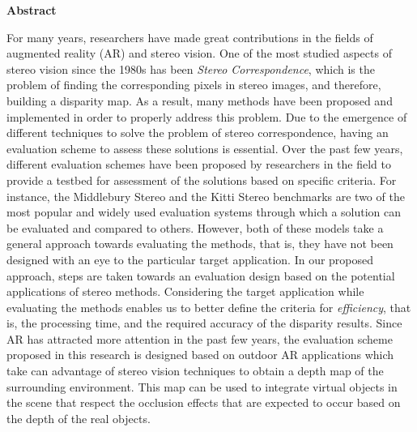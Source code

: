 \begin{center}
\textbf{\large Abstract}
\end{center}
For many years, researchers have made great contributions in the fields of augmented reality (AR) and stereo vision. 
One of the most studied aspects of stereo vision since the 1980s has been \textit{Stereo Correspondence}, which is the problem of 
finding the corresponding pixels in stereo images, and therefore, building a disparity map.
As a result, many methods have been proposed and implemented in order to properly address this problem. 
Due to the emergence of different techniques to solve the problem of stereo correspondence, having an evaluation scheme to assess 
these solutions is essential. Over the past few years, different evaluation schemes have been proposed 
by researchers in the field to provide a testbed for assessment of the solutions based on specific criteria.
For instance, the Middlebury Stereo and the Kitti Stereo benchmarks
are two of the most popular and widely used evaluation systems through which a solution can be evaluated and compared 
to others. 
However, both of these models take a general approach towards evaluating the methods, that is, they 
have not been designed with an eye to the particular target application.
In our proposed approach, steps are taken towards an evaluation design based on the potential applications of stereo methods.
Considering the target application while evaluating the methods enables us to better define the criteria for \textit{efficiency}, that is, the processing time, 
and the required accuracy of the disparity results.
Since AR has attracted more attention in the past few years, 
the evaluation scheme proposed in this research is designed based on outdoor AR applications which take can advantage of
stereo vision techniques to obtain a depth map of the surrounding environment. This map can be used to
integrate virtual objects in the scene that respect the occlusion effects that are expected to occur based on the depth of the real objects. 

